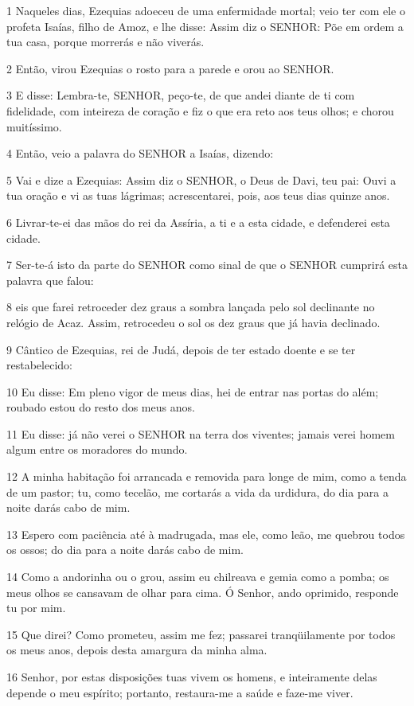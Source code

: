 \par 1 Naqueles dias, Ezequias adoeceu de uma enfermidade mortal; veio ter com ele o profeta Isaías, filho de Amoz, e lhe disse: Assim diz o SENHOR: Põe em ordem a tua casa, porque morrerás e não viverás.
\par 2 Então, virou Ezequias o rosto para a parede e orou ao SENHOR.
\par 3 E disse: Lembra-te, SENHOR, peço-te, de que andei diante de ti com fidelidade, com inteireza de coração e fiz o que era reto aos teus olhos; e chorou muitíssimo.
\par 4 Então, veio a palavra do SENHOR a Isaías, dizendo:
\par 5 Vai e dize a Ezequias: Assim diz o SENHOR, o Deus de Davi, teu pai: Ouvi a tua oração e vi as tuas lágrimas; acrescentarei, pois, aos teus dias quinze anos.
\par 6 Livrar-te-ei das mãos do rei da Assíria, a ti e a esta cidade, e defenderei esta cidade.
\par 7 Ser-te-á isto da parte do SENHOR como sinal de que o SENHOR cumprirá esta palavra que falou:
\par 8 eis que farei retroceder dez graus a sombra lançada pelo sol declinante no relógio de Acaz. Assim, retrocedeu o sol os dez graus que já havia declinado.
\par 9 Cântico de Ezequias, rei de Judá, depois de ter estado doente e se ter restabelecido:
\par 10 Eu disse: Em pleno vigor de meus dias, hei de entrar nas portas do além; roubado estou do resto dos meus anos.
\par 11 Eu disse: já não verei o SENHOR na terra dos viventes; jamais verei homem algum entre os moradores do mundo.
\par 12 A minha habitação foi arrancada e removida para longe de mim, como a tenda de um pastor; tu, como tecelão, me cortarás a vida da urdidura, do dia para a noite darás cabo de mim.
\par 13 Espero com paciência até à madrugada, mas ele, como leão, me quebrou todos os ossos; do dia para a noite darás cabo de mim.
\par 14 Como a andorinha ou o grou, assim eu chilreava e gemia como a pomba; os meus olhos se cansavam de olhar para cima. Ó Senhor, ando oprimido, responde tu por mim.
\par 15 Que direi? Como prometeu, assim me fez; passarei tranqüilamente por todos os meus anos, depois desta amargura da minha alma.
\par 16 Senhor, por estas disposições tuas vivem os homens, e inteiramente delas depende o meu espírito; portanto, restaura-me a saúde e faze-me viver.
